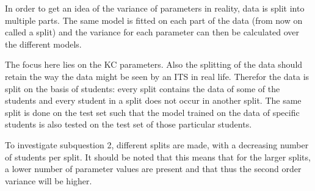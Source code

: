 \documentclass{scrartcl}
\begin{document}
In order to get an idea of the variance of parameters in reality, data is split into multiple parts. The same model is fitted on each part of the data (from now on called a split) and the variance for each parameter can then be calculated over the different models. 

The focus here lies on the KC parameters. Also the splitting of the data should retain the way the data might be seen by an ITS in real life. Therefor the data is split on the basis of students: every split contains the data of some of the students and every student in a split does not occur in another split. The same split is done on the test set such that the model trained on the data of specific students is also tested on the test set of those particular students.

To investigate subquestion 2, different splits are made, with a decreasing number of students per split. It should be noted that this means that for the larger splits, a lower number of parameter values are present and that thus the second order variance will be higher.
\end{document}
